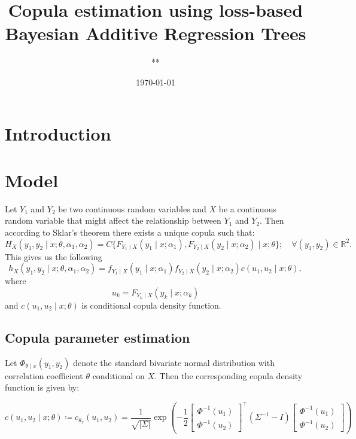 \documentclass{amsart}
\title{Copula estimation using loss-based Bayesian Additive Regression Trees}
\author{**}
\date{\today}
\begin{document}
\maketitle

\section{Introduction}

\section{Model}
Let $Y_1$ and $Y_2$ be two continuous random variables and $X$ be a continuous random variable 
that might affect the relationship between $Y_1$ and $Y_2$. 
Then according to Sklar’s theorem there exists a unique copula such that:
\begin{equation}
    H_{X}(y_1,y_2\mid x; \theta, \alpha_1, \alpha_2) = C\{F_{Y_1\mid X}(y_1\mid x;\alpha_1),F_{Y_2\mid X}(y_2\mid x; \alpha_2)\mid x;\theta\}; \quad \forall (y_1,y_2) \in \mathbb{R}^2.
\end{equation}
This gives us the following
\begin{equation}
    h_{X}(y_1,y_2\mid x; \theta, \alpha_1, \alpha_2) = f_{Y_1\mid X}(y_1\mid x;\alpha_1)f_{Y_2\mid X}(y_2\mid x; \alpha_2)c(u_1,u_2\mid x;\theta),
\end{equation}
where
\begin{equation}\label{eq:emp_dist:Y}
    u_k = F_{Y_k\mid X}(y_k\mid x; \alpha_k)
\end{equation}
and $c(u_1,u_2\mid x;\theta)$ is conditional copula density function.

\subsection{Copula parameter estimation}

Let $\Phi_{\theta\mid x}(y_1, y_2)$ denote the standard bivariate normal distribution with correlation coefficient $\theta$ conditional on $X$. Then
the corresponding copula density function is given by:

\begin{equation}
    c(u_1,u_2\mid x;\theta) \coloneqq c_{\theta_x}(u_1, u_2) 
    = \frac{1}{\sqrt{|\Sigma|}} \exp\left( -\frac{1}{2}
    \begin{bmatrix}
    \Phi^{-1}(u_1) \\
    \Phi^{-1}(u_2)
    \end{bmatrix}^\top
    (\Sigma^{-1} - I)
    \begin{bmatrix}
    \Phi^{-1}(u_1) \\
    \Phi^{-1}(u_2)
    \end{bmatrix}
    \right)
\end{equation}
\end{document}
